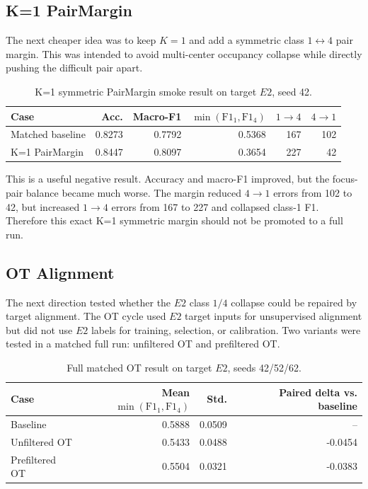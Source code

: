 \documentclass[11pt]{article}
\begin{document}
\subsection{K=1 PairMargin}

The next cheaper idea was to keep $K=1$ and add a symmetric class $1\leftrightarrow4$ pair margin. This was intended to avoid multi-center occupancy collapse while directly pushing the difficult pair apart.

\begin{table}[H]
\centering
\small
\caption{K=1 symmetric PairMargin smoke result on target $E2$, seed 42.}
\label{tab:k1_pairmargin}
\begin{tabular}{lrrrrr}
\toprule
Case & Acc. & Macro-F1 & $\min(\mathrm{F1}_1,\mathrm{F1}_4)$ & $1\rightarrow4$ & $4\rightarrow1$ \\
\midrule
Matched baseline & 0.8273 & 0.7792 & 0.5368 & 167 & 102 \\
K=1 PairMargin & 0.8447 & 0.8097 & 0.3654 & 227 & 42 \\
\bottomrule
\end{tabular}
\end{table}

This is a useful negative result. Accuracy and macro-F1 improved, but the focus-pair balance became much worse. The margin reduced $4\rightarrow1$ errors from 102 to 42, but increased $1\rightarrow4$ errors from 167 to 227 and collapsed class-1 F1. Therefore this exact K=1 symmetric margin should not be promoted to a full run.

\subsection{OT Alignment}

The next direction tested whether the $E2$ class $1/4$ collapse could be repaired by target alignment. The OT cycle used $E2$ target inputs for unsupervised alignment but did not use $E2$ labels for training, selection, or calibration. Two variants were tested in a matched full run: unfiltered OT and prefiltered OT.

\begin{table}[H]
\centering
\small
\caption{Full matched OT result on target $E2$, seeds 42/52/62.}
\label{tab:ot}
\begin{tabular}{lrrr}
\toprule
Case & Mean $\min(\mathrm{F1}_1,\mathrm{F1}_4)$ & Std. & Paired delta vs. baseline \\
\midrule
Baseline & 0.5888 & 0.0509 & -- \\
Unfiltered OT & 0.5433 & 0.0488 & -0.0454 \\
Prefiltered OT & 0.5504 & 0.0321 & -0.0383 \\
\bottomrule
\end{tabular}
\end{table}
\end{document}

